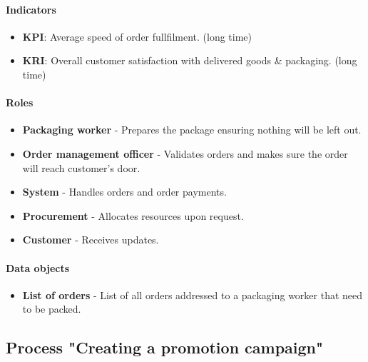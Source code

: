 \documentclass[11pt,a4paper]{article}
\begin{document}
\paragraph{Indicators}

\begin{itemize}
    \item \textbf{KPI}: Average speed of order fullfilment. (long time)
    \item \textbf{KRI}: Overall customer satisfaction with delivered goods \& packaging. (long time)
\end{itemize}

\paragraph{Roles}

\begin{itemize}
    \item \textbf{Packaging worker} - Prepares the package ensuring nothing will be left out.
    \item \textbf{Order management officer} - Validates orders and makes sure the order will reach customer's door.
    \item \textbf{System} - Handles orders and order payments.
    \item \textbf{Procurement} - Allocates resources upon request.
    \item \textbf{Customer} - Receives updates.
\end{itemize}

\paragraph{Data objects}

\begin{itemize}
    \item \textbf{List of orders} - List of all orders addressed to a packaging worker that need to be packed.
\end{itemize}

\newpage




\subsection{Process "Creating a promotion campaign"}
\end{document}
